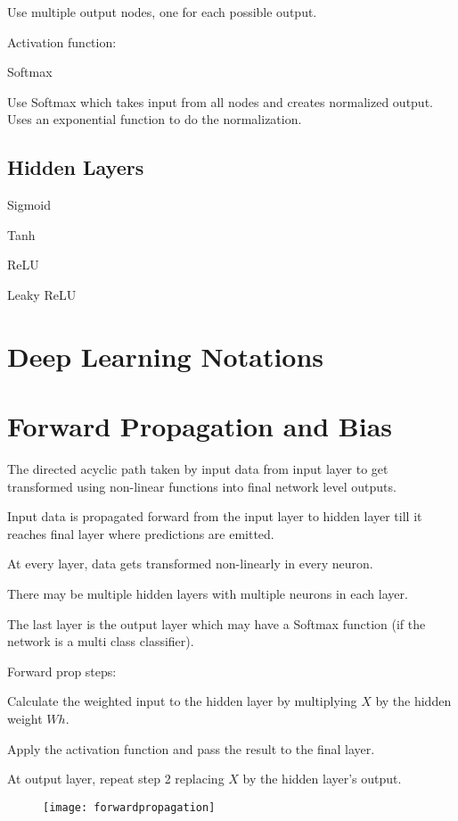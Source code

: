 Use multiple output nodes, one for each possible output.

Activation function:
	\begin{bulletedlist}
		\item Softmax
	\end{bulletedlist}

Use Softmax which takes input from all nodes and creates normalized output.  Uses an exponential function to do the normalization.

	\subsection{Hidden Layers}
	\begin{bulletedlist}
		\item Sigmoid
		\item Tanh
		\item ReLU
		\item Leaky ReLU
	\end{bulletedlist}


	\section{Deep Learning Notations}

	\section{Forward Propagation and Bias}
	\begin{bulletedlist}
		\item The directed acyclic path taken by input data from input layer to get transformed using non-linear functions into final network level outputs.
		\item Input data is propagated forward from the input layer to hidden layer till it reaches final layer where predictions are emitted.
		\item At every layer, data gets transformed non-linearly in every neuron.
		\item There may be multiple hidden layers with multiple neurons in each layer.
		\item The last layer is the output layer which may have a Softmax function (if the network is a multi class classifier).
		\item Forward prop steps:
		\begin{numberedlist}
			\item Calculate the weighted input to the hidden layer by multiplying $X$ by the hidden weight $Wh$.
			\item Apply the activation function and pass the result to the final layer.
			\item At output layer, repeat step 2 replacing $X$ by the hidden layer's output.
		\end{numberedlist}
	\end{bulletedlist}
 	\begin{figure}[h]
		\centering
		\texttt{[image: forwardpropagation]}
		\caption{}
		\label{fig:forwardpropagation}
	\end{figure}

